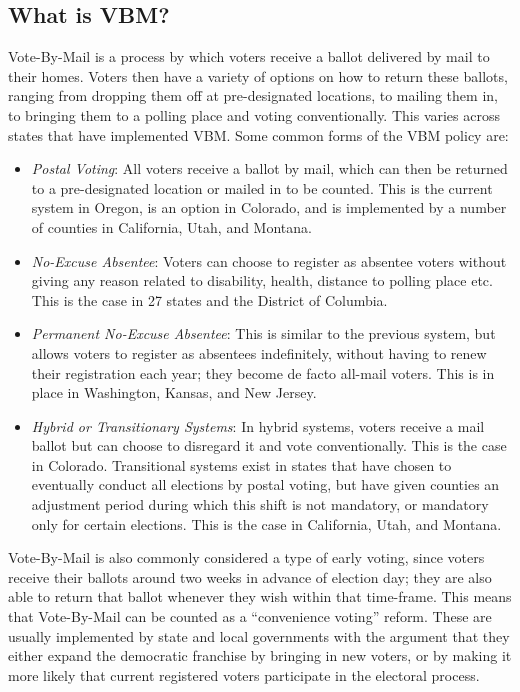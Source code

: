 \documentclass[12pt,twoside]{reedthesis}
\providecommand{\tightlist}{%
  \setlength{\itemsep}{0pt}\setlength{\parskip}{0pt}}
\begin{document}
  \subsection{What is VBM?}\label{what-is-vbm}
  
  Vote-By-Mail is a process by which voters receive a ballot delivered by
  mail to their homes. Voters then have a variety of options on how to
  return these ballots, ranging from dropping them off at pre-designated
  locations, to mailing them in, to bringing them to a polling place and
  voting conventionally. This varies across states that have implemented
  VBM. Some common forms of the VBM policy are:
  
  \begin{itemize}
  \tightlist
  \item
    \emph{Postal Voting}: All voters receive a ballot by mail, which can
    then be returned to a pre-designated location or mailed in to be
    counted. This is the current system in Oregon, is an option in
    Colorado, and is implemented by a number of counties in California,
    Utah, and Montana.\\
  \item
    \emph{No-Excuse Absentee}: Voters can choose to register as absentee
    voters without giving any reason related to disability, health,
    distance to polling place etc. This is the case in 27 states and the
    District of Columbia.\\
  \item
    \emph{Permanent No-Excuse Absentee}: This is similar to the previous
    system, but allows voters to register as absentees indefinitely,
    without having to renew their registration each year; they become de
    facto all-mail voters. This is in place in Washington, Kansas, and New
    Jersey.\\
  \item
    \emph{Hybrid or Transitionary Systems}: In hybrid systems, voters
    receive a mail ballot but can choose to disregard it and vote
    conventionally. This is the case in Colorado. Transitional systems
    exist in states that have chosen to eventually conduct all elections
    by postal voting, but have given counties an adjustment period during
    which this shift is not mandatory, or mandatory only for certain
    elections. This is the case in California, Utah, and Montana.
  \end{itemize}
  
  Vote-By-Mail is also commonly considered a type of early voting, since
  voters receive their ballots around two weeks in advance of election
  day; they are also able to return that ballot whenever they wish within
  that time-frame. This means that Vote-By-Mail can be counted as a
  ``convenience voting'' reform. These are usually implemented by state
  and local governments with the argument that they either expand the
  democratic franchise by bringing in new voters, or by making it more
  likely that current registered voters participate in the electoral
  process.
  
\end{document}
